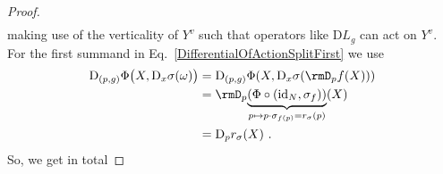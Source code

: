 \documentclass[reqno,a4paper,oneside]{amsart}
\theoremstyle{plain}
\theoremstyle{remark}
\theoremstyle{definition}
\newcommand{\ubrace}[3][3]{{%
  \mspace{#1mu}%
  \underbrace{\mspace{-#1mu}#2\mspace{-#1mu}}_{#3}%
  \mspace{#1mu}%
}}
\begin{document}
\begin{proof}
\begin{align}
\end{align}
making use of the verticality of $Y^v$ such that operators like $\mathrm{D}L_g$ can act on $Y^v$. For the first summand in Eq.\ \eqref{DifferentialOfActionSplitFirst} we use
\begin{align*}
\mathrm{D}_{(p, g)}\Phi\bigl(X, \mathrm{D}_x \sigma (\omega) \bigr)
&=
\mathrm{D}_{(p, g)}\Phi\mleft(X, \mathrm{D}_x \sigma \mleft( \rmD_pf(X) \mright) \mright)
\\
&=
	\rmD_p \ubrace[0]{\mleft( \Phi \circ \mleft( {{\rm id}}_N, \sigma_f \mright) \mright)}{p \mapsto p \cdot \sigma_{f(p)} = r_\sigma(p)}(X)
\\
&=
\mathrm{D}_pr_\sigma(X)~.
\end{align*}
So, we get in total

\end{proof}
\end{document}
